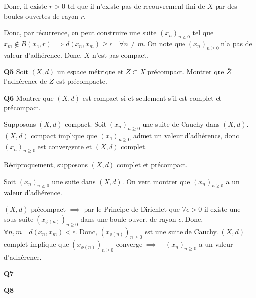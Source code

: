 \documentclass[french]{article}
\begin{document}
 	Donc, il existe $r>0$ tel que il n'existe pas de recouvrement fini de $X$ par des boules ouvertes de rayon $r$.
 	
 	Donc, par récurrence, on peut construire une suite $(x_n)_{n \geq 0}$ tel que $x_m \notin B(x_n, r) \implies d(x_n, x_m) \geq r \quad \forall n \neq m$. On note que $(x_n)_{n \geq 0}$ n'a pas de valeur d'adhérence. Donc, $X$ n'est pas compact.
 
 	\begin{tcolorbox}[colback=gray!5!white,colframe=gray!75!black]
 		\textbf{\large{Q5}} Soit $(X,d)$ un espace métrique et $Z \subset X$ précompact. Montrer que $\bar{Z}$ l'adhérence de $Z$ est précompacte.
 	\end{tcolorbox}
 
 	
	
	\begin{tcolorbox}[colback=gray!5!white,colframe=gray!75!black]
		\textbf{\large{Q6}} Montrer que $(X,d)$ est compact si et seulement s'il est complet et précompact.
	\end{tcolorbox}

	Supposons $(X,d)$ compact. Soit $(x_n)_{n \geq 0}$ une suite de Cauchy dans $(X,d)$. $(X,d)$ compact implique que  $(x_n)_{n \geq 0}$ admet un valeur d'adhérence, donc $(x_n)_{n \geq 0}$ est convergente et $(X,d)$ complet.
	
	Réciproquement, supposons $(X,d)$ complet et précompact.
	
	Soit $(x_n)_{n \geq 0}$ une suite dans $(X,d)$. On veut montrer que $(x_n)_{n \geq 0}$ a un valeur d'adhérence.
	
	$(X,d)$ précompact $\implies$ par le Principe de Dirichlet que $\forall \epsilon > 0$ il existe une sous-suite $(x_{\phi(n)})_{n \geq 0}$ dans une boule ouvert de rayon $\epsilon$. Donc, $\forall n,m \quad d(x_n, x_m) < \epsilon$. Donc, $(x_{\phi(n)})_{n \geq 0}$ est une suite de Cauchy. $(X,d)$ complet implique que $(x_{\phi(n)})_{n \geq 0}$ converge $\implies \quad (x_n)_{n \geq 0}$ a un valeur d'adhérence.

	\newpage

	\begin{tcolorbox}[colback=gray!5!white,colframe=gray!75!black]
		\textbf{\large{Q7}} 
	\end{tcolorbox}
	
	\begin{tcolorbox}[colback=gray!5!white,colframe=gray!75!black]
		\textbf{\large{Q8}} 
	\end{tcolorbox}
\end{document}
